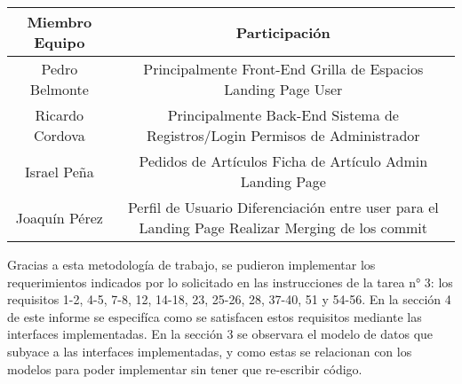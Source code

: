 \begin{table}[H]
  \centering
	\begin{tabular}{|c|c|}
	\hline 
	Miembro Equipo & Participación \\ 
	\hline 
	Pedro Belmonte & 
	\tabitem Principalmente Front-End
	\tabitem Grilla de Espacios
	\tabitem Landing Page User
	\\ 
	\hline 
	Ricardo Cordova & 
	\tabitem Principalmente Back-End
	\tabitem Sistema de Registros/Login
	\tabitem Permisos de Administrador
	\\ 
 	\hline 
	Israel Peña & 
	\tabitem Pedidos de Artículos
	\tabitem Ficha de Artículo
	\tabitem Admin Landing Page
	\\ 
	\hline 
	Joaquín Pérez &
	\tabitem Perfil de Usuario
	\tabitem Diferenciación entre user para el Landing Page
	\tabitem Realizar Merging de los commit 
	\\ 
	\hline 
	\end{tabular} 
\end{table}

Gracias a esta metodología de trabajo, se pudieron implementar los requerimientos indicados por lo solicitado en las instrucciones de la tarea n° 3: los requisitos 1-2, 4-5, 7-8, 12, 14-18, 23, 25-26, 28, 37-40, 51 y 54-56. En la sección 4 de este informe se especifíca como se satisfacen estos requisitos mediante las interfaces implementadas. En la sección 3 se observara el modelo de datos que subyace a las interfaces implementadas, y como estas se relacionan con los modelos para poder implementar sin tener que re-escribir código. 